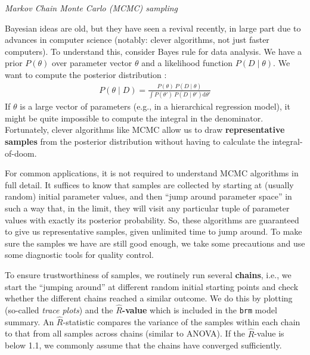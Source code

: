 \documentclass[nobib]{tufte-handout}
\begin{document}
\begin{InfoBox}[]
\centering
\colorbox{mygray}{\centering
  \begin{minipage}{1\textwidth}

    \emph{Markov Chain Monte Carlo (MCMC) sampling}
    \medskip
 
    Bayesian ideas are old, but they have seen a revival recently, in large part due to
    advances in computer science (notably: clever algorithms, not just faster computers). To
    understand this, consider Bayes rule for data analysis. We have a prior $P(\theta)$ over
    parameter vector $\theta$ and a likelihood function $P(D\mid\theta)$. We want to compute
    the posterior distribution
    :
    \begin{eqnarray*}
      P(\theta \mid D) = \frac{P(\theta) \ P(D \mid \theta)}{ \int P(\theta') \ P(D \mid
      \theta') \textrm{d}\theta'}
    \end{eqnarray*}
    If $\theta$ is a large vector of parameters (e.g., in a hierarchical regression model), it
    might be quite impossible to compute the integral in the denominator. Fortunately, clever
    algorithms like MCMC allow us to draw \textbf{representative samples} from the
    posterior distribution without having to calculate the integral-of-doom.

    \medskip
    
    For common applications, it is not required to understand MCMC
    algorithms in full detail. It suffices to know that samples are collected by starting at
    (usually random) initial parameter values, and then ``jump around parameter space'' in such
    a way that, in the limit, they will visit any particular tuple of parameter values with
    exactly its posterior probability. So, these algorithms are guaranteed to give us
    representative samples, given unlimited time to jump around. To make sure the samples we
    have are still good enough, we take some precautions and use some diagnostic tools for
    quality control.

    \medskip
    
    To ensure trustworthiness of samples, we routinely run several \textbf{chains}, i.e., we
    start the ``jumping around'' at different random initial starting points and check whether
    the different chains reached a similar outcome. We do this by plotting (so-called
    \emph{trace plots}) and the \textbf{$\hat{R}$-value} which is included in the \texttt{brm}
    model summary. An $\hat{R}$-statistic compares the variance of the samples within each
    chain to that from all samples across chains (similar to ANOVA). If the $\hat{R}$-value is
    below 1.1, we commonly assume that the chains have converged sufficiently.


\end{minipage}}
\end{InfoBox}
\end{document}
